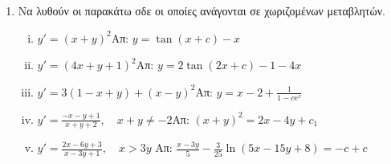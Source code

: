 \begin{enumerate}
  \item Να λυθούν οι παρακάτω σδε οι οποίες ανάγονται σε χωριζομένων μεταβλητών.

    \begin{enumerate}[i)]
      \item $y'=(x+y)^2$\hfill Απ: $y=\tan (x+c)-x$
      \item $y'=(4x+y+1)^2$\hfill Απ: $y=2\tan(2x+c)-1-4x$
      \item $y'=3(1-x+y)+(x-y)^2$\hfill Απ: $y=x-2+\frac{1}{1-c \mathrm{e}^x}$
      \item $y'=\frac{-x-y+1}{x+y+2}, \quad x+y\neq -2$\hfill Απ: $(x+y)^2=2x-4y+c_1$
      \item $y'=\frac{2x-6y+3}{x-3y+1}, \quad x>3y$
        \hfill Απ: $\frac{x-3y}{5}-\frac{3}{25}\ln(5x-15y+8)=-c+c$
    \end{enumerate}
\end{enumerate}



